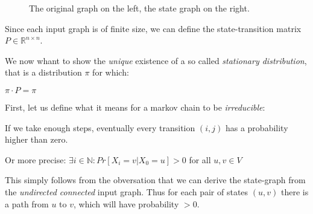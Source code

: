 \begin{figure}
\caption{The original graph on the left, the state graph on the right.}
\label{graph-markov}
\end{figure}

Since each input graph is of finite size, we can define the
state-transition matrix $P \in \mathbb{R}^{n \times n}$.

We now whant to show the \emph{unique} existence of a so called
\emph{stationary distribution}, that is a distribution $\pi$ for which:

$\pi \cdot P = \pi$

First, let us define what it means for a markov chain to be
\emph{irreducible}:

\begin{description}
\itemsep1pt\parskip0pt
\item[irreducibility]
If we take enough steps, eventually every transition $(i, j)$ has a
probability higher than zero.
\end{description}

Or more precise: $\exists i \in \mathbb{N}: Pr[X_i = v | X_0 = u] > 0$
for all $u, v \in V$

This simply follows from the obversation that we can derive the
state-graph from the \emph{undirected connected} input graph. Thus for
each pair of states $(u, v)$ there is a path from $u$ to $v$, which will
have probability $> 0$.

